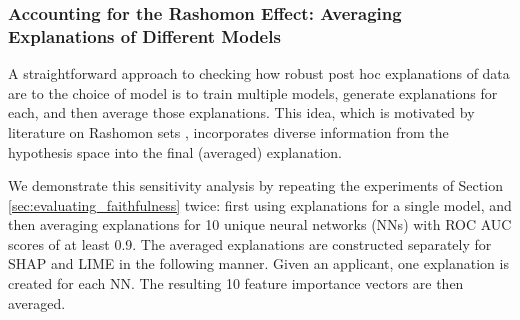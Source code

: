 \documentclass[mnsc,blindrev]{informs3}
\begin{document}
            
       

        \subsubsection{Accounting for the Rashomon Effect: Averaging Explanations of Different Models}
           A straightforward approach to checking how robust post hoc explanations of data are to the choice of model is to train multiple models, generate explanations for each, and then average those explanations. This idea, which is motivated by literature on Rashomon sets \citep{semenova22rashomon,wang2022timbertrek,donnelly2023rashomon},  incorporates diverse information from the hypothesis space into the final (averaged) explanation.


            We demonstrate this sensitivity analysis by repeating the experiments of Section \ref{sec:evaluating_faithfulness} twice: first using explanations for a single model, and then averaging explanations for 10 unique neural networks (NNs) with ROC AUC scores of at least 0.9. The averaged explanations are constructed separately for SHAP and LIME in the following manner. Given an applicant, one explanation is created for each NN. The resulting 10 feature importance vectors are then averaged.%
             
\end{document}
